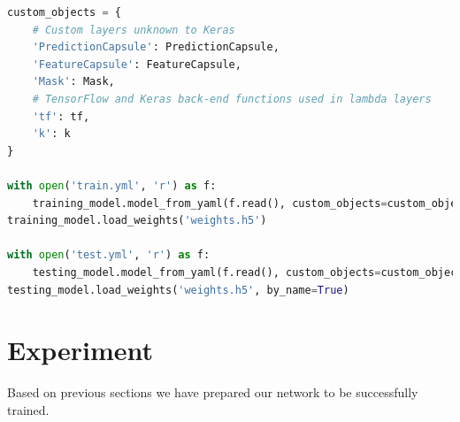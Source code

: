 \begin{lstlisting}[language=Python, caption=Loading a model in \textit{Keras}]
custom_objects = {
    # Custom layers unknown to Keras
    'PredictionCapsule': PredictionCapsule,
    'FeatureCapsule': FeatureCapsule,
    'Mask': Mask,
    # TensorFlow and Keras back-end functions used in lambda layers
    'tf': tf,
    'k': k
}

with open('train.yml', 'r') as f:
    training_model.model_from_yaml(f.read(), custom_objects=custom_objects)
training_model.load_weights('weights.h5')

with open('test.yml', 'r') as f:
    testing_model.model_from_yaml(f.read(), custom_objects=custom_objects)
testing_model.load_weights('weights.h5', by_name=True)
\end{lstlisting}

\section{Experiment}

Based on previous sections we have prepared our network to be successfully trained.
